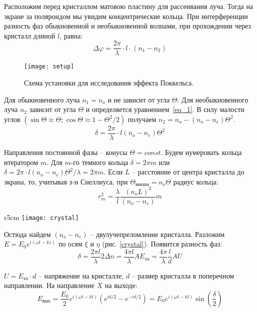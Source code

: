 \documentclass{lab}
\begin{document}
Расположим перед кристаллом матовою пластину для рассеивания луча. Тогда на экране за поляроидом мы увидим концентрические кольца. При интерференции разность фаз обыкновенной и необыкновенной волнами, при прохождении через кристалл длиной $ l $, равна:
\begin{equation}\label{eq_1}
\Delta\varphi = \frac{2\pi}{\lambda} \cdot l \cdot (n_1 - n_2)
\end{equation}

\begin{figure}[H]
	\centering
	\texttt{[image: setup]}
	\caption{Схема установки для исследования эффекта Поккельса.}
	\label{setup}
\end{figure}

Для обыкновенного луча $ n_1 = n_o $ и не зависит от угла $ \Theta $. Для необыкновенного луча $ n_2 $ зависит от угла $ \Theta $ и определяется уравнением~\eqref{eq_1}. В силу малости углов $ (\sin\Theta\approx\Theta; \cos\Theta\approx 1 - \Theta^2/2) $ получаем $ n_2 = n_o - (n_o - n_e) \Theta^2 $.
$$ \delta = \frac{2\pi}{\lambda}\cdot l(n_o - n_e)\Theta^2 $$

Направления постоянной фазы -- конусы $ \Theta = const $. Будем нумеровать кольца итератором $ m $. Для $ m $-го темного кольца $ \delta = 2 \pi m $ или $ \delta = 2\pi \cdot l(n_o - n_e) \Theta^2 / \lambda = 2 \pi m $. Если $ L $ -- расстояние от центра кристалла до экрана, то, учитывая з-н Снеллиуса, при $ \Theta_{внешн} = n_o \Theta $ радиус кольца:
\begin{equation}\label{eq_2}
r_m^2 = \frac{\lambda}{l} \frac{(n_oL)^2}{(n_o-n_e)}m
\end{equation}

\begin{wrapfigure}{r}{5cm}
	\vspace{-2cm}
	\texttt{[image: crystal]}
	\caption{Появление новых главных направлений при наложении электрического поля.}
	\label{crystal}
\end{wrapfigure}

Остюда найдем $ (n_o - n_e) $ -- двулучепреломление кристалла. Разложим $ E = E_0e^{i(\omega t-kz)} $ по осям $ \xi $ и $ \eta $ (рис. \ref{crystal}). Появится разность фаз:
$$ \delta = \frac{2 \pi l}{\lambda}2\Delta n = \frac{4 \pi l}{\lambda}AE_{эл} = \frac{4\pi}{\lambda}\frac{l}{d}AU $$

$ U = E_{эл} \cdot d $ -- напряжение на кристалле, $ d $ -- размер кристалла в поперечном направлении. На направление $ X $ на выходе:
$$ E_{вых} = \frac{E_0}{2}e^{i(\omega t - kl)}(e^{i\delta/2} - e^{-i\delta/2}) = E_0 e^{i(\omega t - kl)} \sin \left(\frac{\delta}{2}\right) $$
\end{document}
